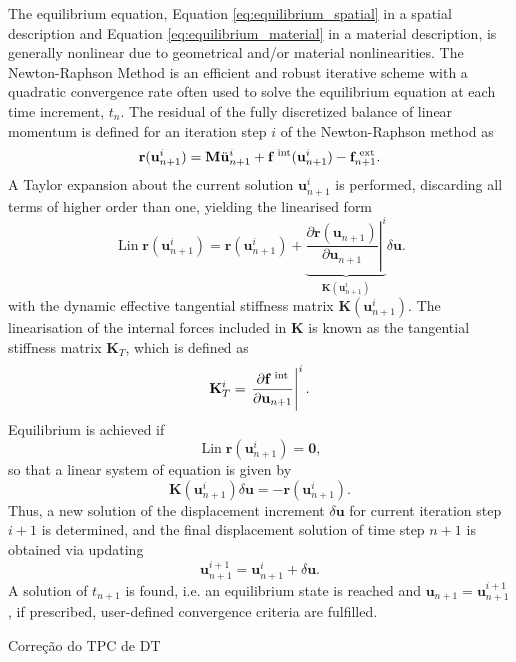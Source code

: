 The equilibrium equation, Equation \eqref{eq:equilibrium_spatial} in a spatial description and Equation \eqref{eq:equilibrium_material} in a material description, is generally nonlinear due to geometrical and/or material nonlinearities.
The Newton-Raphson Method is an efficient and robust iterative scheme with a quadratic convergence rate often used to solve the equilibrium equation at each time increment, $t_n$.
The residual of the fully discretized balance of linear momentum is defined for an iteration step \(i\) of the Newton-Raphson method as
\begin{equation}
\mathbf{r}(\mathbf{u}_{n+1}^{i})=\mathbf{M} \ddot{\mathbf u}_{n+1}^{i}+\mathbf f^\text{\;int} (\mathbf{u}_{n+1}^{i})-\mathbf{f}_{n+1}^\text{\;ext}.
\end{equation}
A Taylor expansion about the current solution \(\mathbf{u}_{n+1}^{i}\) is performed, discarding all terms of  higher order than one, yielding the linearised form
\begin{equation}
\operatorname{Lin} \mathbf{r}(\mathbf{u}_{n+1}^{i})=\mathbf{r}(\mathbf{u}_{n+1}^{i})+\underbrace{\left.\frac{\partial \mathbf{r}(\mathbf{u}_{n+1})}{\partial \mathbf{u}_{n+1} }\right|^{i} }_{\mathbf{K}(\mathbf{u}_{n+1}^{i})} \delta \mathbf{u}.
\end{equation}
with the dynamic effective tangential stiffness matrix \(\mathbf{K}(\mathbf{u}_{n+1}^{i})\).
The linearisation of the internal forces included in \(\mathbf{K}\) is known as the tangential stiffness matrix \(\mathbf{K}_T\), which is defined as
\begin{equation}
\mathbf{K}_{T}^{i}=\left.\frac{\partial \mathbf{f}^{\text{\;int}} }{\partial \mathbf{u}_{n+1}}\right|^{i}.
\end{equation}
Equilibrium is achieved if
\begin{equation}
\operatorname{Lin} \mathbf{r}(\mathbf{u}_{n+1}^{i}) = \mathbf{0},
\end{equation}
so that a linear system of equation is given by
\begin{equation}
\mathbf{K}(\mathbf{u}_{n+1}^{i}) \delta \mathbf{u}=-\mathbf{r}\left(\mathbf{u}_{n+1}^{i}\right).
\end{equation}
Thus, a new solution of the displacement increment \(\delta \mathbf{u}\) for current iteration step \(i+1\) is determined, and the final displacement solution of time step \(n+1\) is obtained via updating
\begin{equation}
\mathbf{u}_{n+1}^{i+1}=\mathbf{u}_{n+1}^{i}+\delta \mathbf{u}.
\end{equation}
A solution of \(t_{n+1}\) is found, i.e. an equilibrium state is reached and \(\mathbf{u}_{n+1}=\mathbf{u}_{n+1}^{i+1}\), if prescribed, user-defined convergence criteria are fulfilled.


Correção do TPC de DT
